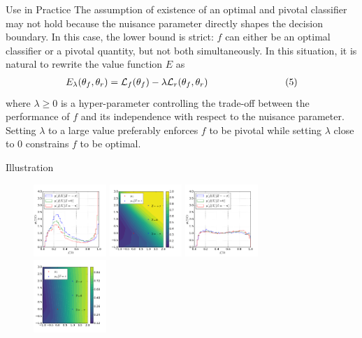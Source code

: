 \documentclass[final]{beamer}
\begin{document}
\begin{frame}{}
\begin{textblock}{0.32}
\vspace{0.3cm}
\begin{block}{Use in Practice\phantom{p}}
The assumption of existence of an optimal and pivotal classifier may
not hold because the nuisance parameter directly shapes the decision boundary.
In this case, the lower bound is strict: $f$ can either be an optimal classifier or a
pivotal quantity, but not both simultaneously. In this situation, it is natural
to rewrite the value function $E$  as
\begin{align}
\nonumber E_\lambda(\theta_f, \theta_r) = {\cal L}_f(\theta_f) - \lambda {\cal L}_r(\theta_f, \theta_r) &&\text{\hspace{2.35cm} (5)}
\end{align}
where $\lambda \geq 0$ is a hyper-parameter controlling the trade-off between
the performance of $f$ and its independence with respect to the nuisance
parameter. Setting $\lambda$ to a large value preferably enforces $f$ to be
pivotal while setting $\lambda$ close to $0$ constrains $f$ to be
optimal. 
\end{block}

\vspace{0.3cm}
\begin{block}{Illustration \phantom{p}}
\begin{figure}
    \begin{center}
        \includegraphics[width=0.245\textwidth]{figures/f-plain.pdf}
        \includegraphics[width=0.245\textwidth]{figures/surface-plain.pdf}
        \includegraphics[width=0.245\textwidth]{figures/f-adversary.pdf}
        \includegraphics[width=0.245\textwidth]{figures/surface-adversary.pdf}
    \end{center}


\end{figure}
\end{block}
\end{textblock}
\end{frame}
\end{document}
